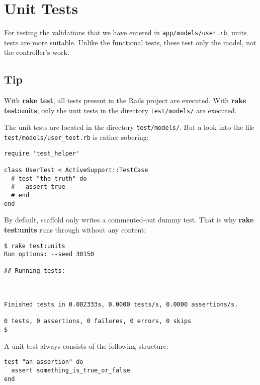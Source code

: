 \documentclass[a4paper]{book}
\newcounter{tab}[chapter]
\begin{document}
\section{Unit Tests}\label{unit-tests}

For testing the validations that we have entered in \texttt{app/models/user.rb}, units tests are more suitable. Unlike the functional tests, these test only the model, not the controller's work.

\subsection{Tip}\label{tip-16}

With \textbf{rake test}, all tests present in the Rails project are executed. With \textbf{rake test:units}, only the unit tests in the directory \texttt{test/models/} are executed.

The unit tests are located in the directory \texttt{test/models/}. But a look into the file \texttt{test/models/user\_test.rb} is rather sobering:

\begin{shaded}\begin{verbatim}
require 'test_helper'

class UserTest < ActiveSupport::TestCase
  # test "the truth" do
  #   assert true
  # end
end
\end{verbatim}\end{shaded}

By default, scaffold only writes a commented-out dummy test. That is why \textbf{rake test:units} runs through without any content:

\begin{shaded}\begin{verbatim}
$ rake test:units
Run options: --seed 30150

## Running tests:



Finished tests in 0.002333s, 0.0000 tests/s, 0.0000 assertions/s.

0 tests, 0 assertions, 0 failures, 0 errors, 0 skips
$
\end{verbatim}\end{shaded}

A unit test always consists of the following structure:

\begin{shaded}\begin{verbatim}
test "an assertion" do
  assert something_is_true_or_false
end
\end{verbatim}\end{shaded}
\end{document}
